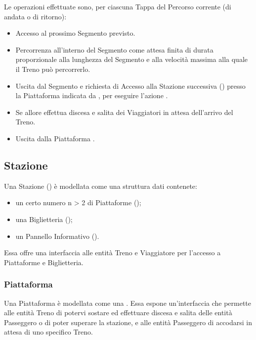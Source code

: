 Le operazioni effettuate sono, per ciascuna Tappa del Percorso corrente (di andata o di ritorno):
				\begin{itemize}
					\item Accesso al prossimo Segmento  previsto.
					\item Percorrenza all'interno del Segmento come attesa finita di durata proporzionale alla lunghezza del Segmento e alla velocità massima alla quale il Treno può percorrerlo.
					\item Uscita dal Segmento e richiesta di Accesso alla Stazione successiva () presso la Piattaforma indicata da , per eseguire l'azione .
					\item Se  allore effettua discesa e salita dei Viaggiatori in attesa dell'arrivo del Treno.
					\item Uscita dalla Piattaforma .
				\end{itemize}
				
	\subsection{Stazione}
	
	Una Stazione () è modellata come una struttura dati contenete:
		\begin{itemize}
			\item un certo numero n > 2 di Piattaforme ();
			\item una Biglietteria ();
			\item un Pannello Informativo ().
		\end{itemize}
	Essa offre una interfaccia alle entità Treno e Viaggiatore per l'accesso a Piattaforme e Biglietteria.
		
		\subsubsection{Piattaforma}
	
		Una Piattaforma è modellata come una . Essa espone un'interfaccia che permette alle entità Treno di potervi sostare ed effettuare discesa e salita delle entità Passeggero o di poter superare la stazione, e alle entità Passeggero di accodarsi in attesa di uno specifico Treno.
		
